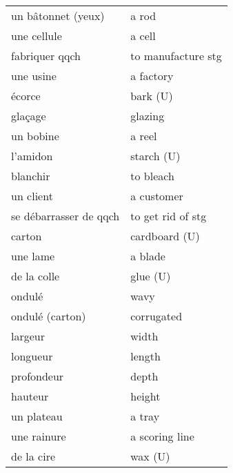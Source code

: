 \documentclass[
  10pt,
]{article}
\begin{document}
\begin{longtable}{ll}
\rowcolor{gray!6}  un bâtonnet (yeux) & a rod\\

une cellule & a cell\\

\rowcolor{gray!6}  fabriquer qqch & to manufacture stg\\

une usine & a factory\\

\rowcolor{gray!6}  écorce & bark (U)\\

glaçage & glazing\\

\rowcolor{gray!6}  un bobine & a reel\\

l'amidon & starch (U)\\

\rowcolor{gray!6}  blanchir & to bleach\\

un client & a customer\\

\rowcolor{gray!6}  se débarrasser de qqch & to get rid of stg\\

carton & cardboard (U)\\

\rowcolor{gray!6}  une lame & a blade\\

de la colle & glue (U)\\

\rowcolor{gray!6}  ondulé & wavy\\

ondulé (carton) & corrugated\\

\rowcolor{gray!6}  largeur & width\\

longueur & length\\

\rowcolor{gray!6}  profondeur & depth\\

hauteur & height\\

\rowcolor{gray!6}  un plateau & a tray\\

une rainure & a scoring line\\

\rowcolor{gray!6}  de la cire & wax (U)\\


\end{longtable}
\end{document}
